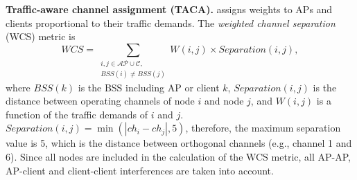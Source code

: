 

\label{TACA}
\textbf{Traffic-aware channel assignment (TACA).}
\cite{Traffic-aware-CA-2007} assigns weights to APs and clients proportional to their traffic demands. 
The \textit{weighted channel separation} (WCS) metric is
\begin{equation}
\label{interference-metric}
WCS = \sum_{\substack{i,j  \in \mathcal{AP} \cup \mathcal{C}, \\ BSS(i)\neq BSS(j) }} W(i,j)\times Separation(i,j),
\end{equation}
where $BSS(k)$ is the BSS including AP or client $k$, $Separation(i,j)$ is the distance between operating channels of node $i$ and node $j$, and $W(i,j)$ is a function of the traffic demands of $i$ and $j$.
$Separation(i,j)=\min{(|ch_i-ch_j|,5)}$, therefore, the maximum separation value is 5, which is the distance between orthogonal channels (e.g., channel 1 and 6).
Since all nodes are included in the calculation of the WCS metric, all AP-AP, AP-client and client-client interferences are taken into account. 

